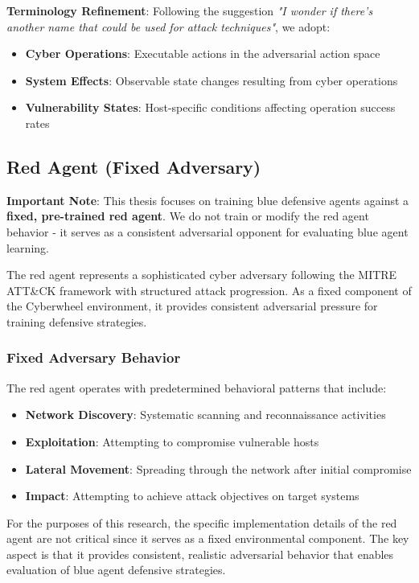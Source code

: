 \documentclass[12pt,twoside]{article}
\theoremstyle{definition}
\theoremstyle{plain}
\begin{document}
\textbf{Terminology Refinement}: Following the suggestion \textit{"I wonder if there's another name that could be used for attack techniques"}, we adopt:
\begin{itemize}
\item \textbf{Cyber Operations}: Executable actions in the adversarial action space
\item \textbf{System Effects}: Observable state changes resulting from cyber operations
\item \textbf{Vulnerability States}: Host-specific conditions affecting operation success rates
\end{itemize}

\subsection{Red Agent (Fixed Adversary)}

\textbf{Important Note}: This thesis focuses on training blue defensive agents against a \textbf{fixed, pre-trained red agent}. We do not train or modify the red agent behavior - it serves as a consistent adversarial opponent for evaluating blue agent learning.

The red agent represents a sophisticated cyber adversary following the MITRE ATT\&CK framework with structured attack progression. As a fixed component of the Cyberwheel environment, it provides consistent adversarial pressure for training defensive strategies.

\subsubsection{Fixed Adversary Behavior}
The red agent operates with predetermined behavioral patterns that include:
\begin{itemize}
\item \textbf{Network Discovery}: Systematic scanning and reconnaissance activities
\item \textbf{Exploitation}: Attempting to compromise vulnerable hosts
\item \textbf{Lateral Movement}: Spreading through the network after initial compromise
\item \textbf{Impact}: Attempting to achieve attack objectives on target systems
\end{itemize}

For the purposes of this research, the specific implementation details of the red agent are not critical since it serves as a fixed environmental component. The key aspect is that it provides consistent, realistic adversarial behavior that enables evaluation of blue agent defensive strategies.
\end{document}
